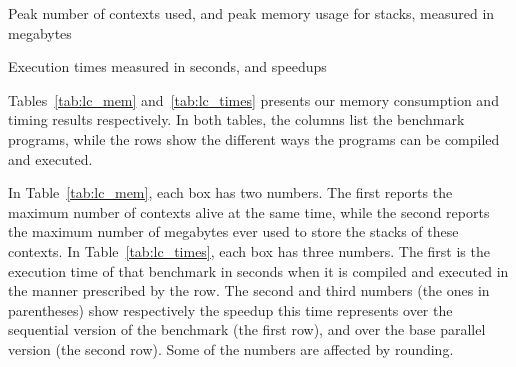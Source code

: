 
\begin{sidewaystable}[tbp]
\begin{center}

\caption[Peak number of contexts used,
and peak memory usage for stacks]{Peak number of contexts used,
and peak memory usage for stacks, measured in megabytes}
\label{tab:lc_mem}
\end{center}
\end{sidewaystable}

\begin{sidewaystable}[tbp]
\begin{center}

\caption{Execution times measured in seconds, and speedups}
\label{tab:lc_times}
\end{center}
\end{sidewaystable}

Tables~\ref{tab:lc_mem} and~\ref{tab:lc_times}
presents our memory consumption and timing results respectively.
In both tables,
the columns list the benchmark programs,
while the rows show the different ways
the programs can be compiled and executed.

In Table~\ref{tab:lc_mem}, each box has two numbers.
The first reports the maximum number of contexts alive at the same time,
while the second reports the maximum number of megabytes
ever used to store the stacks of these contexts.
In Table~\ref{tab:lc_times}, each box has three numbers.
The first is the execution time of that benchmark in seconds
when it is compiled and executed in the manner prescribed by the row.
The second and third numbers (the ones in parentheses)
show respectively the speedup this time represents
over the sequential version of the benchmark (the first row),
and over the base parallel version (the second row).
Some of the numbers are affected by rounding.

